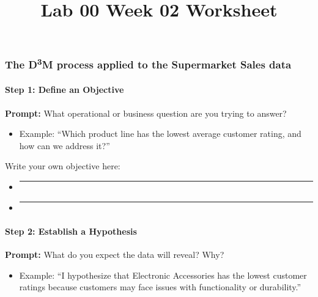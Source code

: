 \documentclass[
  11pt,
]{article}
\title{Lab 00 Week 02 Worksheet}
\author{}
\date{\vspace{-2.5em}}
\providecommand{\tightlist}{%
  \setlength{\itemsep}{0pt}\setlength{\parskip}{0pt}}
\begin{document}
\maketitle

\subsubsection{\texorpdfstring{The D\textsuperscript{3}M process applied
to the Supermarket Sales
data}{The D3M process applied to the Supermarket Sales data}}\label{the-d3m-process-applied-to-the-supermarket-sales-data}

\paragraph{Step 1: Define an
Objective}\label{step-1-define-an-objective}

\textbf{Prompt:} What operational or business question are you trying to
answer?

\begin{itemize}
\tightlist
\item
  Example: ``Which product line has the lowest average customer rating,
  and how can we address it?''
\end{itemize}

Write your own objective here:

\begin{itemize}
\item
  \begin{center}\rule{0.5\linewidth}{0.5pt}\end{center}
\item
  \begin{center}\rule{0.5\linewidth}{0.5pt}\end{center}
\end{itemize}

\paragraph{Step 2: Establish a
Hypothesis}\label{step-2-establish-a-hypothesis}

\textbf{Prompt:} What do you expect the data will reveal? Why?

\begin{itemize}
\tightlist
\item
  Example: ``I hypothesize that Electronic Accessories has the lowest
  customer ratings because customers may face issues with functionality
  or durability.''
\end{itemize}
\end{document}
